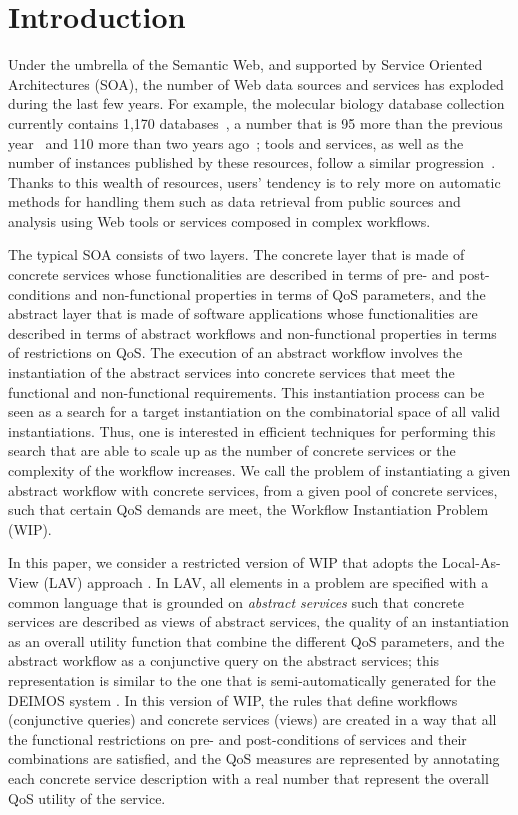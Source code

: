 \documentclass{llncs}
\begin{document}
\section{Introduction}

Under the umbrella of the Semantic Web, and supported by Service Oriented
Architectures (SOA), the number of Web data sources and services has exploded
during the last few years. For example, the molecular biology database
collection currently contains 1,170 databases~\cite{Galperin09}, a number
that is 95 more than the previous year~\cite{Galperin2008} and 110 more
than two years ago~\cite{Galperin2007}; tools and services, as well as the
number of instances published by these resources, follow a similar
progression~\cite{Benson07}. Thanks to this wealth of resources, users'
tendency is to rely more on automatic methods for handling them such as
data retrieval from public sources and analysis using Web
tools or services composed in complex workflows.

The typical SOA consists of two layers. The concrete layer that is
made of concrete services whose functionalities are described in
terms of pre- and post-conditions and non-functional properties in
terms of QoS parameters, and the abstract layer that is made of 
software applications whose functionalities are described in terms
of abstract workflows and non-functional properties in terms of
restrictions on QoS.
The execution of an abstract workflow involves the instantiation
of the abstract services into concrete services that meet the
functional and non-functional requirements. This instantiation
process can be seen as a search for a target instantiation on
the combinatorial space of all valid instantiations.
Thus, one is interested in efficient techniques for performing
this search that are able to scale up as the number of concrete
services or the complexity of the workflow increases.
We call the problem of instantiating a given abstract workflow
with concrete services, from a given pool of concrete services,
such that certain QoS demands are meet, the Workflow Instantiation
Problem (WIP).

In this paper, we consider a restricted version of WIP that adopts
the Local-As-View (LAV) approach \cite{levy:bucket}.
In LAV, all elements in a problem are specified with a common language
that is grounded on \emph{abstract services} such that concrete
services are described as views of abstract services, the quality
of an instantiation as an overall utility function that combine the
different QoS parameters, and the abstract workflow as a conjunctive
query on the abstract services; this representation is similar to the
one that is semi-automatically generated for the DEIMOS system
\cite{AmbiteISWC09}.
In this version of WIP, the rules that define workflows (conjunctive queries)
and concrete services (views) are created in a way that all the 
functional restrictions on pre- and post-conditions of services
and their combinations are satisfied, and the QoS measures are
represented by annotating each concrete service description with
a real number that represent the overall QoS utility of the service.
\end{document}
